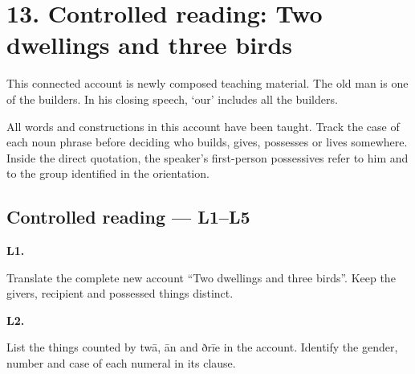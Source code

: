 \section*{13. Controlled reading: Two dwellings and three birds}

This connected account is newly composed teaching material. The old man is one of the builders. In his closing speech, ‘our’ includes all the builders.

\par\begin{minipage}{\linewidth}\raggedright
{}
\end{minipage}\par

All words and constructions in this account have been taught. Track the case of each noun phrase before deciding who builds, gives, possesses or lives somewhere. Inside the direct quotation, the speaker’s first-person possessives refer to him and to the group identified in the orientation.

\subsection*{Controlled reading — L1–L5}

\par\begin{minipage}{\linewidth}\raggedright
\textbf{L1.}

Translate the complete new account “Two dwellings and three birds”. Keep the givers, recipient and possessed things distinct.

\end{minipage}\par\addvspace{4pt}

\par\begin{minipage}{\linewidth}\raggedright
\textbf{L2.}

List the things counted by twā, ān and ðrīe in the account. Identify the gender, number and case of each numeral in its clause.

\end{minipage}\par\addvspace{4pt}

